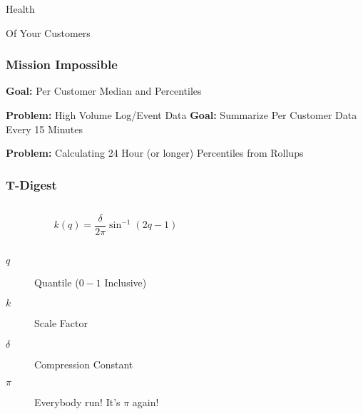 

\begin{frame}[standout]
    Health

    {\small Of Your Customers}
\end{frame}


\begin{frame}
    \frametitle{Mission Impossible}

    \textbf{Goal:} Per Customer Median and Percentiles

    \textbf{Problem:} High Volume Log/Event Data
    \vskip 1cm
    \textbf{Goal:} Summarize Per Customer Data Every 15 Minutes

    \textbf{Problem:} Calculating 24 Hour (or longer) Percentiles from Rollups
\end{frame}

\begin{frame}
    \frametitle{T-Digest}

    \begin{columns}
        \begin{column}{0.4\textwidth}

            $$ k(q) = \frac{\delta}{2\pi} \sin^{-1}(2q-1) $$
            ~
            \begin{description}
                \item[$q$] Quantile ($0 - 1$ Inclusive)
                \item[$k$]  Scale Factor
                \item[$\delta$] Compression Constant
                \item[$\pi$] Everybody run!  It's $\pi$ again!
            \end{description}
        \end{column}
        \begin{column}{0.6\textwidth}
            \begin{figure}[!h]
                \centering
                \resizebox{\columnwidth}{!}{}
            \end{figure}
        \end{column}
    \end{columns}
\end{frame}



